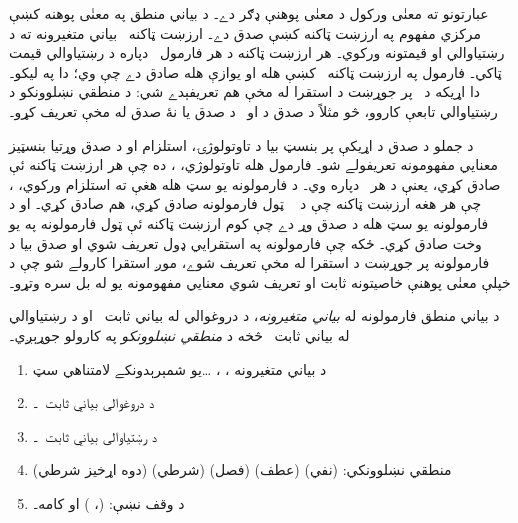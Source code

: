 \documentclass[12pt,a4paper,oneside]{report}
\newcommand{\olfileid}[3]{\gdef\pspart{#1}\gdef\pschapter{#2}\gdef\pssection{#3}}
\gdef\pspart{#2}\gdef\pschapter{#3}\gdef\pssection{}%
\theoremstyle{definition}
\begin{document}
\label{olpseg:OLP-0057-B008:start}
عبارتونو ته معنٰی ورکول د معنٰی پوهنې ډګر دے۔ د بياني منطق په
معنٰی پوهنه کښې مرکزي مفهوم په ارزښت ټاکنه کښې صدق دے۔
ارزښت ټاکنه~ بياني متغيرونه ته د
رښتياوالي \LR{$\True$} او \LR{$\False$} قيمتونه ورکوي۔ هر ارزښت ټاکنه د هر
فارمول~ دپاره د رښتياوالي قيمت  ټاکي۔
فارمول په ارزښت ټاکنه~ کښې هله او يوازې هله
صادق دے چې  وي؛ دا په  ليکو۔
دا اړيکه د~ پر جوړښت د استقرا له مخې هم تعريفېدے شي: د منطقي
نښلوونکو د رښتياوالي تابعې کاروو، څو مثلاً د  صدق د
 او~ د صدق يا نۀ صدق له مخې تعريف کړو۔
\label{olpseg:OLP-0057-B008:end}

\label{olpseg:OLP-0057-B009:start}
د جملو د صدق د اړيکې  پر بنسټ بيا د تاوتولوژۍ،
استلزام او د صدق وړتيا بنسټيز معنايي مفهومونه تعريفولے شو۔
فارمول هله تاوتولوژي، ، ده چې هر ارزښت ټاکنه
ئې صادق کړي، يعنې د هر~ دپاره
 وي۔ د فارمولونه يو سټ هله هغې ته
استلزام ورکوي، ، چې هر هغه ارزښت ټاکنه چې د
~\LR{$\Gamma$} ټول فارمولونه صادق کړي،  هم صادق کړي۔ او د
فارمولونه يو سټ هله د صدق وړ دے چې کوم ارزښت ټاکنه ئې ټول
فارمولونه په يو وخت صادق کړي۔ ځکه چې فارمولونه په استقرايي
ډول تعريف شوي او صدق بيا د فارمولونه پر جوړښت د استقرا له مخې
تعريف شوے، موږ استقرا کارولے شو چې د خپلې معنٰی پوهنې خاصيتونه ثابت
او تعريف شوي معنايي مفهومونه يو له بل سره وتړو۔
\label{olpseg:OLP-0057-B009:end}

\label{olpseg:OLP-0058-B004:start}
\olfileid{pl}{syn}{fml}
\label{olpseg:OLP-0058-B004:end}

\label{olpseg:OLP-0058-B005:start}
\label{olpseg:OLP-0058-B005:end}

\label{olpseg:OLP-0058-B006:start}
د بياني منطق فارمولونه له \emph{بياني متغيرونه}، د دروغوالي له
  بياني ثابت~\LR{$\lfalse$}
    او د رښتياوالي له بياني ثابت~\LR{$\ltrue$} څخه د \emph{منطقي
  نښلوونکو} په کارولو جوړېږي۔
\label{olpseg:OLP-0058-B006:end}

\label{olpseg:OLP-0058-B007:start}
\begin{enumerate}
\item د بياني متغيرونه ،
  ، \dots يو شمېرېدونکے لامتناهي سټ~\LR{$\PVar$}
\item د دروغوالی بياني ثابت~\LR{$\lfalse$}۔
\item د رښتياوالی بياني ثابت~\LR{$\ltrue$}۔
\item منطقي نښلوونکي:
  \startycommalist
  \ycomma \LR{$\lnot$} (نفي)%
  \ycomma \LR{$\land$} (عطف)%
  \ycomma \LR{$\lor$} (فصل)%
  \ycomma \LR{$\lif$} (شرطي)%
  \ycomma \LR{$\liff$} (دوه اړخيز شرطي)%
\item د وقف نښې: (، ) او کامه۔
\end{enumerate}
\label{olpseg:OLP-0058-B007:end}
\end{document}
